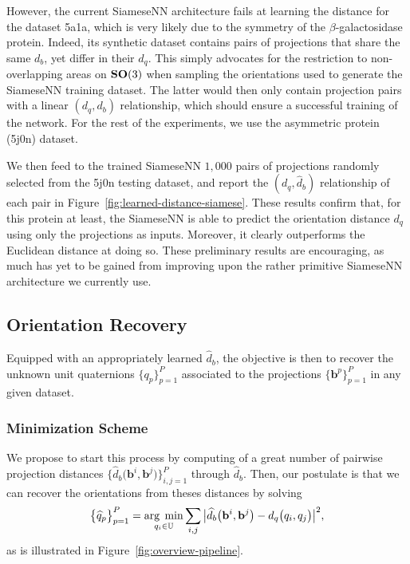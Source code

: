However, the current SiameseNN architecture fails at learning the distance for the dataset 5a1a, which is very likely due to the symmetry of the $\beta$-galactosidase protein. Indeed, its synthetic dataset contains pairs of projections that share the same $d_b$, yet differ in their $d_q$. This simply advocates for the restriction to non-overlapping areas on $\mathrm{\mathbf{SO}}(3)$ when sampling the orientations used to generate the SiameseNN training dataset. The latter would then only contain projection pairs with a linear $(d_q,d_b)$ relationship, which should ensure a successful training of the network. For the rest of the experiments, we use the asymmetric protein (5j0n) dataset.

We then feed to the trained SiameseNN $1,000$ pairs of projections randomly selected from the 5j0n testing dataset, and report the $(d_q,\widehat{d}_b)$ relationship of each pair in Figure~\ref{fig:learned-distance-siamese}. These results confirm that, for this protein at least, the SiameseNN is able to predict the orientation distance $d_q$ using only the projections as inputs. Moreover, it clearly outperforms the Euclidean distance at doing so. These preliminary results are encouraging, as much has yet to be gained from improving upon the rather primitive SiameseNN architecture we currently use.

\subsection{Orientation Recovery}
\label{sec:orientation-recovery}

Equipped with an appropriately learned $\widehat{d}_b$, the objective is then to recover the unknown unit quaternions $\big\{q_p\big\}_{p=1}^P$ associated to the projections $\big\{\mathbf{b}^p\big\}_{p=1}^P$ in any given dataset.

\subsubsection{Minimization Scheme}

We propose to start this process by computing of a great number of pairwise projection distances $\big\{\widehat{d}_b\big(\mathbf{b}^i,\mathbf{b}^j\big)\big\}_{i,j=1}^{P}$ through $\widehat{d}_b$. Then, our postulate is that we can recover the orientations from theses distances by solving
\begin{equation}
    \label{eq:global-min-problem}
    \big\{\widehat{q}_p\big\}_{p=1}^P=\underset{q_i\in\mathbb{U}}{\arg\;\min}\sum_{i,j} \big|\widehat{d}_b\big(\mathbf{b}^i,\mathbf{b}^j\big) - d_q\big(q_i,q_j\big) \big|^2,
\end{equation}
as is illustrated in Figure~\ref{fig:overview-pipeline}.

